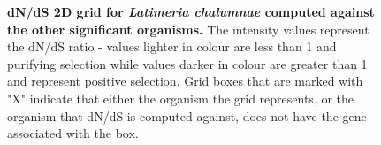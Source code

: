 \documentclass{article}
\begin{document}
\begin{figure}[H]
\centering
{}
\caption{\textbf{dN/dS 2D grid for \textit{Latimeria chalumnae} computed against the other significant organisms.} The intensity values represent the dN/dS ratio - values lighter in colour are less than 1 and purifying selection while values darker in colour are greater than 1 and represent positive selection. Grid boxes that are marked with "X" indicate that either the organism the grid represents, or the organism that dN/dS is computed against, does not have the gene associated with the box.}
\label{sup_fig_27}
\end{figure}
\end{document}
